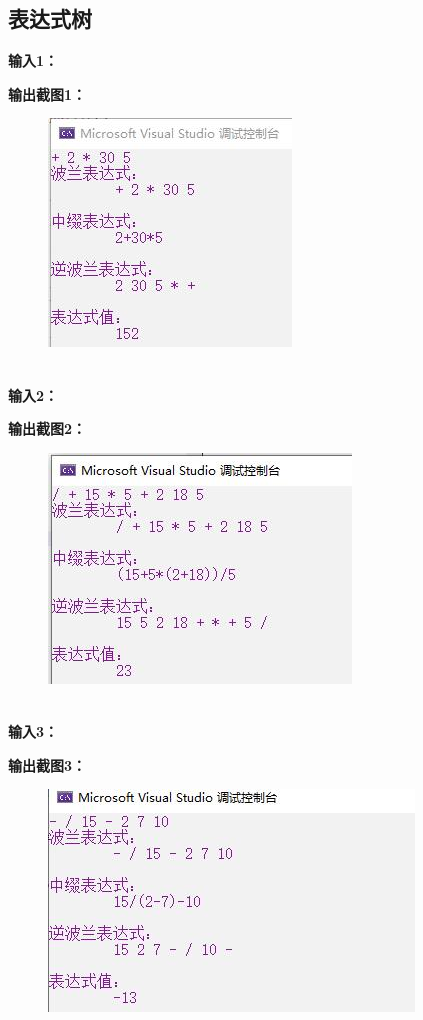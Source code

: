 \documentclass[UTF8]{article}
\newcommand{\jumpLine} {\hspace*{\fill} \\}
\begin{document}
	\subsection{表达式树}
	\textbf{输入1：}\par
	\par
	\textbf{输出截图1：}\par
	\begin{figure}[H]
		\centering
		\includegraphics[width=0.5\linewidth]{test2_1.jpg}
		\label{test2_1}
	\end{figure}\par
	\jumpLine
	\textbf{输入2：}\par
	\par
	\textbf{输出截图2：}\par
	\begin{figure}[H]
		\centering
		\includegraphics[width=0.5\linewidth]{test2_2.jpg}
		\label{test2_2}
	\end{figure}\par
	\jumpLine
	\textbf{输入3：}\par
	\par
	\textbf{输出截图3：}\par
	\begin{figure}[H]
		\centering
		\includegraphics[width=0.5\linewidth]{test2_3.jpg}
		\label{test2_3}
	\end{figure}\par
\end{document}
